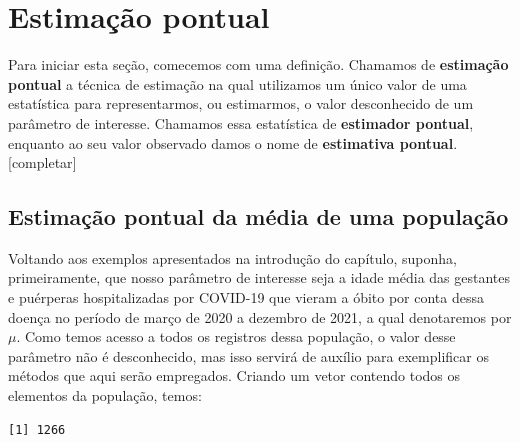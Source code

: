\documentclass[
  letterpaper,
  DIV=11,
  numbers=noendperiod]{scrreprt}
\newenvironment{Shaded}{\begin{snugshade}}{\end{snugshade}}
\newcommand{\FunctionTok}[1]{\textcolor[rgb]{0.28,0.35,0.67}{#1}}
\newcommand{\NormalTok}[1]{\textcolor[rgb]{0.00,0.23,0.31}{#1}}
\newcommand{\OtherTok}[1]{\textcolor[rgb]{0.00,0.23,0.31}{#1}}
\newcommand{\SpecialCharTok}[1]{\textcolor[rgb]{0.37,0.37,0.37}{#1}}
\newcommand{\StringTok}[1]{\textcolor[rgb]{0.13,0.47,0.30}{#1}}
\begin{document}
\hypertarget{estimauxe7uxe3o-pontual}{%
\section{Estimação pontual}\label{estimauxe7uxe3o-pontual}}

Para iniciar esta seção, comecemos com uma definição. Chamamos de
\textbf{estimação pontual} a técnica de estimação na qual utilizamos um
único valor de uma estatística para representarmos, ou estimarmos, o
valor desconhecido de um parâmetro de interesse. Chamamos essa
estatística de \textbf{estimador pontual}, enquanto ao seu valor
observado damos o nome de \textbf{estimativa pontual}. {[}completar{]}

\hypertarget{estimauxe7uxe3o-pontual-da-muxe9dia-de-uma-populauxe7uxe3o}{%
\subsection{Estimação pontual da média de uma
população}\label{estimauxe7uxe3o-pontual-da-muxe9dia-de-uma-populauxe7uxe3o}}

Voltando aos exemplos apresentados na introdução do capítulo, suponha,
primeiramente, que nosso parâmetro de interesse seja a idade média das
gestantes e puérperas hospitalizadas por COVID-19 que vieram a óbito por
conta dessa doença no período de março de 2020 a dezembro de 2021, a
qual denotaremos por \(\mu\). Como temos acesso a todos os registros
dessa população, o valor desse parâmetro não é desconhecido, mas isso
servirá de auxílio para exemplificar os métodos que aqui serão
empregados. Criando um vetor contendo todos os elementos da população,
temos:

\begin{Shaded}
\end{Shaded}

\begin{verbatim}
[1] 1266
\end{verbatim}
\end{document}
